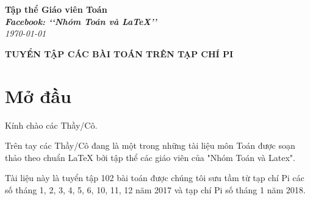 \documentclass[12pt,a4paper,oneside]{book}
\renewcommand{\baselinestretch}{1.4}
\theoremstyle{nonumberplain}
\begin{document}
	\providecommand*{\dx}{\ensuremath{\mathrm{\,d}}x}
	\providecommand*{\unit}[1]{\ensuremath{\mathrm{\,#1}}}
	
	\begin{titlepage}
		\begin{flushright}
			\fontsize{17}{0}\selectfont
			\textbf{Tập thể Giáo viên Toán}\\
			\textbf{\textit{Facebook: \lq\lq Nhóm Toán và LaTeX\rq\rq}}\\
			\textit{\color{red}\today}
		\end{flushright}
		
		\vspace{4cm}
		
		\begin{flushright}
			
			\vspace{1cm}
			
			\textbf{\fontsize{33}{0}\selectfont T\fontsize{29}{0}\selectfont UYỂN TẬP CÁC BÀI TOÁN TRÊN TẠP CHÍ PI}
			
			\vspace{1cm}
			
		\end{flushright}
		
		\vfill{
		}
	\end{titlepage}
	\pagestyle{empty}
	\renewcommand{\headrulewidth}{0.4pt}
	
	{\renewcommand{\baselinestretch}{1.3}
		\tableofcontents
	}
	
	\pagestyle{fancy}
	\lhead{\empty}
	\rhead{\empty}
	\lfoot{\currfilename}
	\chapter*{Mở đầu}
	Kính chào các Thầy/Cô.
	
	\vspace{0.6cm}
	
	\noindent Trên tay các Thầy/Cô đang là một trong những tài liệu môn Toán được soạn thảo theo chuẩn \LaTeX{} bởi tập thể các giáo viên của "Nhóm Toán và Latex".
	
	\vspace{0.6cm}
	
	\noindent Tài liệu này là tuyển tập 102 bài toán được chúng tôi sưu tầm từ  tạp chí Pi các số tháng 1, 2, 3, 4, 5, 6, 10, 11, 12 năm 2017 và tạp chí Pi số tháng 1 năm 2018.
	
	
	
	
	
	
	
	
	
	
	
\end{document}
